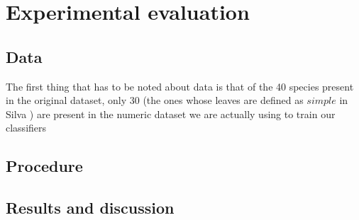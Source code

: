 \documentclass{article}
\begin{document}
\section{Experimental evaluation}

\subsection{Data}
The first thing that has to be noted about data is that of the 40 species present in the original dataset, only 30 (the ones whose leaves are defined as $\textit{simple}$ in Silva \cite{silva}) are present in the numeric dataset we are actually using to train our classifiers
\subsection{Procedure}

\subsection{Results and discussion}



\newpage


\end{document}
